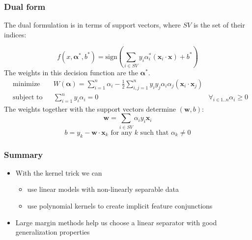 \documentclass{beamer}
\newcommand{\vecb}[1]{\mathbf{#1}}
\newcommand{\x}{\mathbf{x}}
\begin{document}
\begin{frame}
\frametitle{Dual form}
\begin{small}
  The dual formulation is in terms of support vectors, where $SV$ is
  the set of their indices:

\begin{equation}\label{svm-dual-decision}
 f(x,\vecb{\alpha}^*,b^*) = \mathrm{sign}\left(\sum_{i\in SV} y_i\alpha_i^*(\x_i\cdot\x)+b^*\right)
\end{equation}
The weights in this decision function are the 
$\vecb{\alpha}^*$. %
\begin{equation}\label{svm-dual-objective}
\begin{aligned}
& \text{minimize} & & W(\vecb{\alpha}) 
 	= \sum_{i=1}^n\alpha_i - \frac{1}{2} \sum_{i,j=1}^n y_i y_j\alpha_i\alpha_j(\x_i\cdot\x_j)\\
& \text{subject to} & & \sum_{i=1}^n y_i\alpha_i = 0    & \forall_{i \in 1..n} \alpha_i \geq 0
\end{aligned}
\end{equation}
The weights together with the support vectors determine
$(\vecb{w},b)$:
\begin{equation}
 \vecb{w} = \sum_{i\in SV}\alpha_i y_i\x_i
\end{equation}
\begin{equation}
 b = y_k - \vecb{w}\cdot \x_k \text{ for any $k$ such that } \alpha_k \neq 0
\end{equation}
\end{small}
\end{frame}


\begin{frame}\frametitle{Summary}
  \begin{itemize}
  \item With the kernel trick we can 
    \begin{itemize}
    \item use linear models with non-linearly separable data
    \item use polynomial kernels to create implicit feature conjunctions
    \end{itemize}
  \item Large margin methods help us choose a linear separator with
    good generalization properties
  \end{itemize}
\end{frame}
\end{document}
